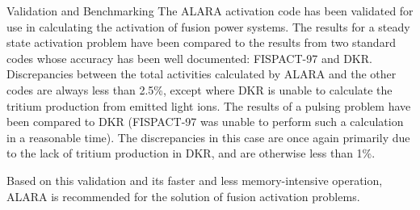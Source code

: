 \begin{chapter}{Validation and Benchmarking}
The ALARA activation code has been validated for use in calculating
the activation of fusion power systems.  The results for a steady
state activation problem have been compared to the results from two
standard codes whose accuracy has been well
documented\cite{bib:IAEA.bench2.rep}: FISPACT-97 and DKR.
Discrepancies between the total activities calculated by ALARA and the
other codes are always less than 2.5\%, except where DKR is
unable to calculate the tritium production from emitted light ions.
The results of a pulsing problem have been compared to DKR
(FISPACT-97 was unable to perform such a calculation in a reasonable
time).  The discrepancies in this case are once again primarily due to
the lack of tritium production in DKR, and are otherwise less
than 1\%.

Based on this validation and its faster and less memory-intensive
operation, ALARA is recommended for the solution of fusion activation
problems.


\end{chapter}